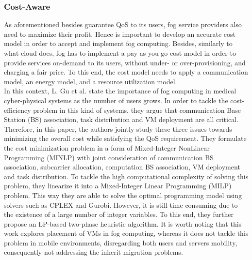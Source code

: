 \subsubsection{Cost-Aware}
\noindent As aforementioned besides guarantee QoS to its users, fog service providers also need to maximize their profit. Hence is important to develop an accurate cost model in order to accept and implement fog computing. Besides, similarly to what cloud does, fog has to implement a pay-as-you-go cost model in order to provide services on-demand to its users, without under- or over-provisioning, and charging a fair price. To this end, the cost model needs to apply a communication model, an energy model, and a resource utilization model.\\
\noindent\tab In this context, L. Gu et al. \cite{gu2017cost} state the importance of fog computing in medical cyber-physical systems as the number of users grows. In order to tackle the cost-efficiency problem in this kind of systems, they argue that communication Base Station (BS) association, task distribution and VM deployment are all critical. Therefore, in this paper, the authors jointly study these three issues towards minimizing the overall cost while satisfying the QoS requirement. They formulate the cost minimization problem in a form of Mixed-Integer NonLinear Programming (MINLP) with joint consideration of communication BS association, subcarrier allocation, computation BS association, VM deployment and task distribution. To tackle the high computational complexity of solving this problem, they linearize it into a Mixed-Integer Linear Programming (MILP) problem. This way they are able to solve the optimal programming model using solvers such as CPLEX and Gurobi. However, it is still time consuming due to the existence of a large number of integer variables. To this end, they further propose an LP-based two-phase heuristic algorithm. It is worth noting that this work explores placement of VMs in fog computing, whereas it does not tackle this problem in mobile environments, disregarding both users and servers mobility, consequently not addressing the inherit migration problems.\\
